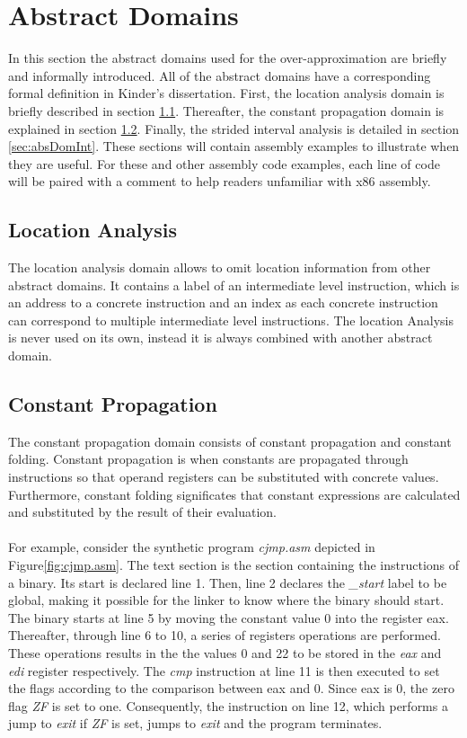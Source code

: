 \documentclass{kththesis}
\renewcommand{\it}[1]{\textit{#1}}
\begin{document}
\section{Abstract Domains}
In this section the abstract domains used for the over-approximation are briefly and informally introduced. All of the abstract domains have a corresponding formal definition in Kinder's dissertation\cite{Jakstab}. First, the location analysis domain is briefly described in section \ref{sec:absDomLoc}. Thereafter, the constant propagation domain is explained in section \ref{sec:absDomCon}. Finally, the strided interval analysis is detailed in section \ref{sec:absDomInt}. These sections will contain assembly examples to illustrate when they are useful. For these and other assembly code examples, each line of code will be paired with a comment to help readers unfamiliar with x86 assembly.

\subsection{Location Analysis}\label{sec:absDomLoc}
The location analysis domain allows to omit location information from other abstract domains. It contains a label of an intermediate level instruction, which is an address to a concrete instruction and an index as each concrete instruction can correspond to multiple intermediate level instructions. The location Analysis is never used on its own, instead it is always combined with another abstract domain.

\subsection{Constant Propagation}\label{sec:absDomCon}
The constant propagation domain consists of constant propagation and constant folding. Constant propagation is when constants are propagated through instructions so that operand registers can be substituted with concrete values. Furthermore, constant folding significates that constant expressions are calculated and substituted by the result of their evaluation.
\\ \\
For example, consider the synthetic program \it{cjmp.asm} depicted in Figure\ref{fig:cjmp.asm}. The text section is the section containing the instructions of a binary. Its start is declared line 1. Then, line 2 declares the \it{\_start} label to be global, making it possible for the linker to know where the binary should start. The binary starts at line 5 by moving the constant value 0 into the register eax. Thereafter, through line 6 to 10, a series of registers operations are performed. These operations results in the the values 0 and 22 to be stored in the \it{eax} and \it{edi} register respectively. The \it{cmp} instruction at line 11 is then executed to set the flags according to the comparison between eax and 0. Since eax is 0, the zero flag \it{ZF} is set to one. Consequently, the instruction on line 12, which performs a jump to \it{exit} if \it{ZF} is set, jumps to \it{exit} and the program terminates. 
\end{document}
